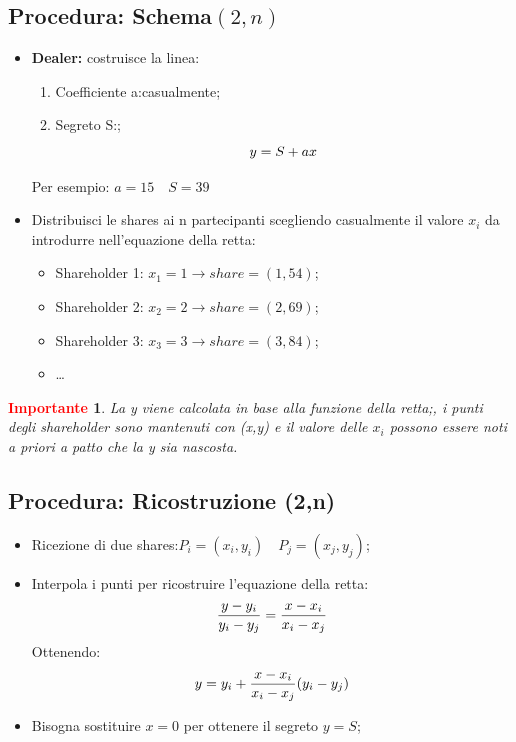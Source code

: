 \documentclass{book}
\newtheorem*{Importante}{\textbf{\textcolor{red}{Importante}}}
\begin{document}
\subsection{Procedura: Schema\((2,n)\)}
\begin{itemize}
	\item \textbf{Dealer:} costruisce la linea:
	      \begin{enumerate}
		      \item Coefficiente a:\@scelto casualmente;
		      \item Segreto S:\@noto;
		            \begin{equation*}
			            \centering
			            y=S+ax
		            \end{equation*}
	      \end{enumerate}
	      Per esempio: \(a=15\quad S=39\)
	\item Distribuisci le shares ai n partecipanti scegliendo casualmente il valore \(x_{i}\) da introdurre nell'equazione della retta:
	      \begin{itemize}
		      \item Shareholder 1: \(x_{1}=1\rightarrow share=(1,54)\);
		      \item Shareholder 2: \(x_{2}=2\rightarrow share=(2,69)\);
		      \item Shareholder 3: \(x_{3}=3\rightarrow share=(3,84)\);
		      \item \dots
	      \end{itemize}
\end{itemize}
\begin{Importante}
	La y viene calcolata in base alla funzione della retta;\@tuttavia, i punti degli shareholder sono mantenuti con (x,y) e il valore delle \(x_{i}\) possono essere noti a priori a patto che la y sia nascosta\@.
\end{Importante}
\subsection{Procedura: Ricostruzione (2,n)}
\begin{itemize}
	\item Ricezione di due shares:\(P_{i}=(x_{i},y_{i})\quad P_{j}=(x_{j},y_{j})\);
	\item Interpola i punti per ricostruire l'equazione della retta:
	      \begin{equation*}
		      \centering
		      \frac{y-y_{i}}{y_{i}-y_{j}}=\frac{x-x_{i}}{x_{i}-x_{j}}
	      \end{equation*}
	      Ottenendo:
	      \begin{equation*}
		      \centering
		      y=y_{i}+\frac{x-x_{i}}{x_{i}-x_{j}}(y_{i}-y_{j})
	      \end{equation*}
	\item Bisogna sostituire \(x=0\) per ottenere il segreto \(y=S\);
\end{itemize}
\end{document}
